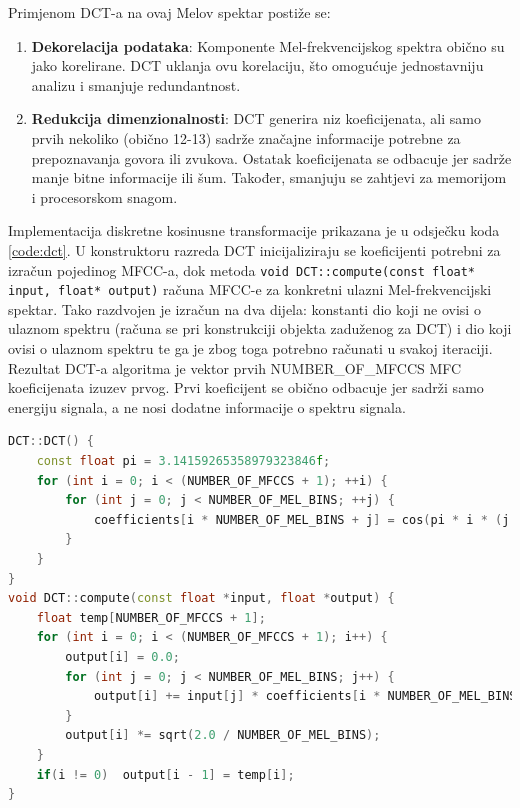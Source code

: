 Primjenom DCT-a na ovaj Melov spektar postiže se:

\begin{enumerate}
\item \textbf{Dekorelacija podataka}: Komponente Mel-frekvencijskog spektra obično su jako 
korelirane. DCT uklanja ovu korelaciju, što omogućuje jednostavniju analizu i smanjuje
redundantnost.

\item \textbf{Redukcija dimenzionalnosti}: DCT generira niz koeficijenata, ali samo prvih
nekoliko (obično 12-13) sadrže značajne informacije potrebne za prepoznavanja govora ili zvukova. 
Ostatak koeficijenata se odbacuje jer sadrže manje bitne informacije ili šum. Također,
smanjuju se zahtjevi za memorijom i procesorskom snagom.
\end{enumerate}

Implementacija diskretne kosinusne transformacije prikazana je u odsječku koda \ref{code:dct}.
U konstruktoru razreda DCT inicijaliziraju se koeficijenti potrebni za izračun pojedinog MFCC-a,
dok metoda \texttt{void DCT::compute(const float* input, float* output)} 
računa MFCC-e za konkretni ulazni Mel-frekvencijski spektar. Tako
razdvojen je izračun na dva dijela: konstanti dio koji ne ovisi o ulaznom spektru (računa
se pri konstrukciji objekta zaduženog za DCT) i dio koji
ovisi o ulaznom spektru te ga je zbog toga potrebno računati u svakoj iteraciji.
Rezultat DCT-a algoritma je vektor prvih NUMBER\_OF\_MFCCS MFC koeficijenata izuzev
prvog. Prvi koeficijent se obično odbacuje jer sadrži samo energiju signala, a ne nosi
dodatne informacije o spektru signala.

\newpage
\begin{lstlisting}[language=C++, caption=Diskretna kosinusna transformacija, label=code:dct]
DCT::DCT() {
    const float pi = 3.14159265358979323846f;
    for (int i = 0; i < (NUMBER_OF_MFCCS + 1); ++i) {
        for (int j = 0; j < NUMBER_OF_MEL_BINS; ++j) {
            coefficients[i * NUMBER_OF_MEL_BINS + j] = cos(pi * i * (j + 0.5f) / NUMBER_OF_MEL_BINS);
        }
    }
}
void DCT::compute(const float *input, float *output) {
    float temp[NUMBER_OF_MFCCS + 1];
    for (int i = 0; i < (NUMBER_OF_MFCCS + 1); i++) {
        output[i] = 0.0;
        for (int j = 0; j < NUMBER_OF_MEL_BINS; j++) {
            output[i] += input[j] * coefficients[i * NUMBER_OF_MEL_BINS + j];
        }
        output[i] *= sqrt(2.0 / NUMBER_OF_MEL_BINS);
    }
    if(i != 0)  output[i - 1] = temp[i];
}
\end{lstlisting}

